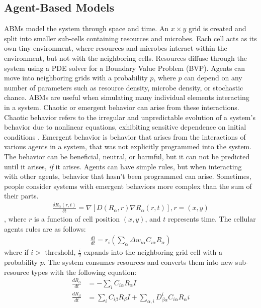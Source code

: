 \subsection{Agent-Based Models}
ABMs model the system through space and time.
An $x \times y$ grid is created and split into smaller sub-cells containing resources and microbes.
Each cell acts as its own tiny environment, where resources and microbes interact within the environment, but not with the neighboring cells.
Resources diffuse through the system using a PDE solver for a Boundary Value Problem (BVP).
Agents can move into neighboring grids with a probability $p$, where $p$ can depend on any number of parameters such as resource density, microbe density, or stochastic chance. \newline 
ABMs are useful when simulating many individual elements interacting in a system.
Chaotic or emergent behavior can arise from these interactions.
Chaotic behavior refers to the irregular and unpredictable evolution of a system's behavior due to nonlinear equations, exhibiting sensitive dependence on initial conditions \cite{encyclopedia_of_physical_science_and_technology}. \newline 
Emergent behavior is behavior that arises from the interactions of various agents in a system, that was not explicitly programmed into the system.
The behavior can be beneficial, neutral, or harmful, but it can not be predicted until it arises, \textit{if} it arises.
Agents can have simple rules, but when interacting with other agents, behavior that hasn't been programmed can arise.
Sometimes, people consider systems with emergent behaviors more complex than the sum of their parts. \newline
\begin{align*} 
    \frac{\delta R_\alpha(r, t)}{\delta t} = \nabla \left[D \left( R_\alpha, r\right) \nabla R_\alpha \left( r, t \right) \right], r = \left(x, y\right)
\end{align*}, where $r$ is a function of cell position $(x, y)$, and $t$ represents time. 
The cellular agents rules are as follows: 
\begin{align*} 
    \frac{di}{dt} = r_i \left( \sum_\alpha \Delta w_{i\alpha}C_{i\alpha}R_\alpha\right)
\end{align*} where if $i > \text{ threshold, }\frac{i}{2}$ expands into the neighboring grid cell with a probability $p$. 
The system consumes resources and converts them into new sub-resource types with the following equation:
\begin{align*} 
    \frac{dR_\alpha}{dt} &= -\sum_i C_{i\alpha}R_\alpha I \\
    \frac{dR_\beta}{dt} &= \sum_i C_{i\beta}R_\beta I + \sum_{\alpha, i}D_{\beta \alpha}^{i} C_{i \alpha} R_\alpha i
\end{align*}

